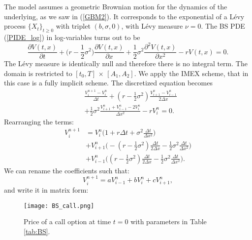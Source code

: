 The \cite{BS73} model assumes a geometric Brownian motion for the dynamics of the underlying, as we saw in (\ref{GBM2}).
It corresponds to the exponential of a Lévy process $\{X_t\}_{t\geq 0}$ with triplet $(b,\sigma,0)$, with Lévy measure $\nu = 0$.
The BS PDE (\ref{PIDE_log}) in log-variables turns out to be
\begin{equation}\label{BS_PDE}
\frac{\partial  V(t,x)}{\partial t}  
          + \biggl( r -\frac{1}{2}\sigma^2 \biggr) \frac{\partial V(t,x)}{\partial x}
          + \frac{1}{2} \sigma^2 \frac{\partial^2  V(t,x)}{\partial x^2} - r  V(t,x)  = 0.
\end{equation}
The Lévy measure is identically null and therefore there is no integral term.
The domain is restricted to $[t_0,T]\, \times \, [A_1,A_2]$. We apply the IMEX scheme, that in this case is a fully implicit scheme.  
The discretized equation becomes
\begin{align}
&\frac{V^{n+1}_{i} -V^{n}_{i}}{\Delta t} + 
(r-\frac{1}{2}\sigma^2) \frac{V^{n}_{i+1} -V^{n}_{i-1}}{ 2 \Delta x} \\ \nonumber
&+ \frac{1}{2} \sigma^2 \frac{V^{n}_{i+1} + V^{n}_{i-1} - 2 V^{n}_{i}}{\Delta x^2}  - r V^{n}_i = 0.
\end{align}
Rearranging the terms: 
\begin{align*}
 V^{n+1}_{i} &= V^{n}_{i} \biggl( 1 + r\Delta t + \sigma^2 \frac{\Delta t}{\Delta x^2} \biggr)  \\
& + V^{n}_{i+1} \biggl( -(r -\frac{1}{2}\sigma^2)\frac{\Delta t}{2 \Delta x} -
\frac{1}{2}\sigma^2 \frac{\Delta t}{\Delta x^2}  \biggr)  \\
& + V^{n}_{i-1} \biggl( (r -\frac{1}{2}\sigma^2)\frac{\Delta t}{2 \Delta x} - 
\frac{1}{2}\sigma^2 \frac{\Delta t}{\Delta x^2}  \biggr).
\end{align*}
We can rename the coefficients such that:
$$ V^{n+1}_{i} = a V^{n}_{i-1} + b V^{n}_{i} + c V^{n}_{i+1}, $$
and write it in matrix form:
\begin{figure}[t]
   \centering
   \texttt{[image: BS\_call.png]}
   \caption{Price of a call option at time $t=0$ with parameters in Table \ref{tab:BS}.}
   \label{BS_call}
\end{figure}  
